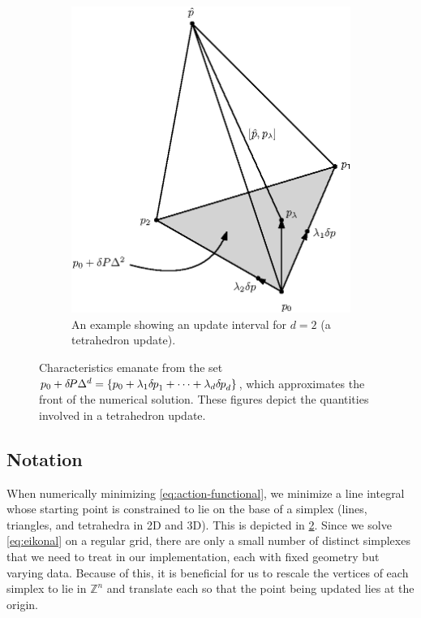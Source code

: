 \documentclass[sisc-eikonal.tex]{subfiles}
\begin{document}
\begin{figure}
\begin{subfigure}{.44\textwidth}
    \includegraphics[width=\linewidth]{simplex-diagram.eps}
    \caption{An example showing an update interval for $d = 2$ (a
      tetrahedron update).}\label{fig:tetra-diagram}
  \end{subfigure}
  \caption{Characteristics emanate from the set
    $p_0 + {\delta \hspace{-0.14em} P} \Delta^d = \left\{p_0 + \lambda_1 {\delta \hspace{-0.08em} p}_1 + \cdots +
      \lambda_d {\delta \hspace{-0.08em} p}_d\right\}$, which approximates the front of the
    numerical solution. These figures depict the quantities involved
    in a tetrahedron update.}\label{fig:simplex-diagrams}
\end{figure}

\subsection{Notation}\label{ssec:notation}

When numerically minimizing \cref{eq:action-functional}, we minimize a
line integral whose starting point is constrained to lie on the base
of a simplex (lines, triangles, and tetrahedra in 2D and 3D). This is
depicted in \cref{fig:simplex-diagrams}. Since we solve
\cref{eq:eikonal} on a regular grid, there are only a small number of
distinct simplexes that we need to treat in our implementation, each
with fixed geometry but varying data. Because of this, it is
beneficial for us to rescale the vertices of each simplex to lie in
$\mathbb{Z}^n$ and translate each so that the point being updated lies
at the origin.
\end{document}
